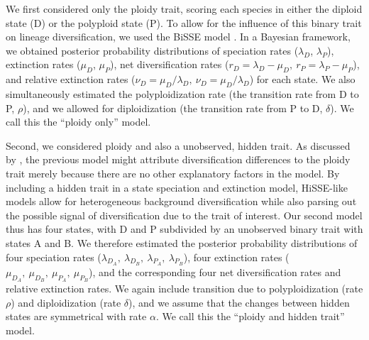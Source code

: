 We first considered only the ploidy trait, scoring each species in either the diploid state (D) or the polyploid state (P).
To allow for the influence of this binary trait on lineage diversification, we used the BiSSE model \citep{maddison_2007}.
In a Bayesian framework, we obtained posterior probability distributions of speciation rates ($\lambda_D$, $\lambda_P$), extinction rates ($\mu_D$, $\mu_P$), net diversification rates ($r_D=\lambda_D-\mu_D,\ r_P=\lambda_P-\mu_P$), and relative extinction rates ($\nu_D = \mu_D / \lambda_D,\ \nu_D = \mu_D / \lambda_D$) for each state.
We also simultaneously estimated the polyploidization rate (the transition rate from D to P, $\rho$), and we allowed for diploidization (the transition rate from P to D, $\delta$).
We call this the ``ploidy only'' model. %

Second, we considered ploidy and also a unobserved, hidden trait.
As discussed by \citet{beaulieu_2016}, the previous model might attribute diversification differences to the ploidy trait merely because there are no other explanatory factors in the model.
By including a hidden trait in a state speciation and extinction model, HiSSE-like models allow for heterogeneous background diversification while also parsing out the possible signal of diversification due to the trait of interest. 
Our second model thus has four states, with D and P subdivided by an unobserved binary trait with states A and B.
We therefore estimated the posterior probability distributions of four speciation rates ($\lambda_{D_A},\ \lambda_{D_B},\  \lambda_{P_A},\ \lambda_{P_B}$), four extinction rates ($\mu_{D_A},\ \mu_{D_B},\ \mu_{P_A},\ \mu_{P_B}$), and the corresponding four net diversification rates and relative extinction rates.
We again include transition due to polyploidization (rate $\rho$) and diploidization (rate $\delta$), and we assume that the changes between hidden states are symmetrical with rate $\alpha$.
We call this the ``ploidy and hidden trait'' model.

